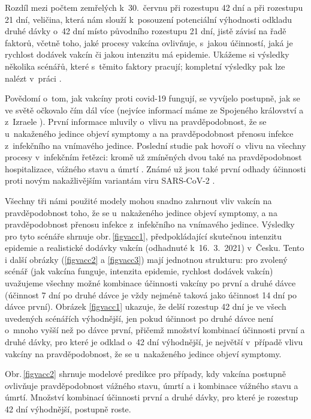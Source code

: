 Rozdíl mezi počtem zemřelých k~30.\ červnu při rozestupu 42 dní a při rozestupu 21 dní, veličina, která nám slouží k~posouzení potenciální výhodnosti odkladu druhé dávky o~42 dní místo původního rozestupu 21 dní, jistě závisí na řadě faktorů, včetně toho, jaké procesy vakcína ovlivňuje, s~jakou účinností, jaká je rychlost dodávek vakcín či jakou intenzitu má epidemie. Ukážeme si výsledky několika scénářů, které s~těmito faktory pracují; kompletní výsledky pak lze nalézt v~práci \cite{vaccpaper}.

Povědomí o~tom, jak vakcíny proti covid-19 fungují, se vyvíjelo postupně, jak se ve světě očkovalo čím dál více (nejvíce informací máme ze Spojeného království \cite{Hall_etal2021,Vasileiou_etal2021} a z~Izraele \cite{Haas_etal2021}). První informace mluvily o~vlivu na pravděpodobnost, že se u~nakaženého jedince objeví symptomy a na pravděpodobnost přenosu infekce z~infekčního na vnímavého jedince. Poslední studie pak hovoří o~vlivu na všechny procesy v~infekčním řetězci: kromě už zmíněných dvou také na pravděpodobnost hospitalizace, vážného stavu a úmrtí \cite{Haas_etal2021}. Známé už jsou také první odhady účinnosti proti novým nakažlivějším variantám viru SARS-CoV-2 \cite[a reference uvnitř]{Shapiro_etal2021,delta}. 

Všechny tři námi použité modely mohou snadno zahrnout vliv vakcín na prav\-dě\-po\-dob\-nost toho, že se u~nakaženého jedince objeví symptomy, a na pravděpodobnost přenosu infekce z~infekčního na vnímavého jedince. Výsledky pro tyto scénáře shrnuje obr.\,\ref{figvacc1}, předpokládající skutečnou intenzitu epidemie a realistické dodávky vakcín (odhadnuté k~16.\ 3.\ 2021) v~Česku. Tento i další obrázky (\ref{figvacc2} a \ref{figvacc3}) mají jednotnou strukturu: pro zvolený scénář (jak vakcína funguje, intenzita epidemie, rychlost dodávek vakcín) uvažujeme všechny možné kombinace účinnosti vakcíny po první a druhé dávce (účinnost 7 dní po druhé dávce je vždy nejméně taková jako účinnost 14 dní po dávce první). Obrázek \ref{figvacc1} ukazuje, že delší rozestup 42 dní je ve všech uvedených scénářích výhodnější, jen pokud účinnost po druhé dávce není o~mnoho vyšší než po dávce první, přičemž množství kombinací účinnosti první a druhé dávky, pro které je odklad o~42 dní výhodnější, je největší v~případě vlivu vakcíny na pravděpodobnost, že se u~nakaženého jedince objeví symptomy.


 
Obr.\,\ref{figvacc2} shrnuje modelové predikce pro případy, kdy vakcína postupně ovlivňuje pravděpodobnost vážného stavu, úmrtí a i kombinace vážného stavu a úmrtí. Množství kombinací účinnosti první a druhé dávky, pro které je rozestup 42 dní výhodnější, postupně roste.
 


